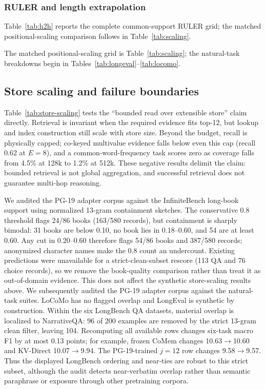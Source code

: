 

\subsubsection{RULER and length extrapolation}
Table~\ref{tab:h2h} reports the complete common-support RULER grid; the
matched positional-scaling comparison follows in Table~\ref{tab:scaling}.

The matched positional-scaling grid is Table~\ref{tab:scaling}; the natural-task breakdowns begin in Tables~\ref{tab:longeval}--\ref{tab:locomo}.






\subsection{Store scaling and failure boundaries}
\label{app:scaling}
Table~\ref{tab:store-scaling} tests the ``bounded read over extensible store''
claim directly. Retrieval is invariant when the required evidence fits top-12,
but lookup and index construction still scale with store size. Beyond the budget,
recall is physically capped; co-keyed multivalue evidence falls below even this
cap (recall 0.62 at $E{=}8$), and a common-word-frequency task scores zero as
coverage falls from 4.5\% at 128k to 1.2\% at 512k. These negative results delimit
the claim: bounded retrieval is not global aggregation, and successful retrieval
does not guarantee multi-hop reasoning.



We audited the PG-19 adapter corpus against the InfiniteBench long-book support
using normalized 13-gram containment sketches. The conservative 0.8 threshold
flags 24/86 books (163/580 records), but containment is sharply bimodal: 31 books
are below 0.10, no book lies in 0.18--0.60, and 54 are at least 0.60. Any cut in
0.20--0.60 therefore flags 54/86 books and 387/580 records; anonymized character
names make the 0.8 count an undercount. Existing predictions were unavailable
for a strict-clean-subset rescore (113 QA and 76 choice records), so we remove
the book-quality comparison rather than treat it as out-of-domain evidence.
This does not affect the synthetic store-scaling results above.
We subsequently audited the PG-19 adapter corpus against the natural-task
suites. LoCoMo has no flagged overlap and LongEval is synthetic by construction.
Within the six LongBench QA datasets, material overlap is localized to
NarrativeQA: 96 of 200 examples are removed by the strict 13-gram clean filter,
leaving 104. Recomputing all available rows changes six-task macro F1 by at most
0.13 points; for example, frozen CoMem changes 10.63$\rightarrow$10.60 and
KV-Direct 10.07$\rightarrow$9.94. The PG-19-trained $j{=}12$ row changes
9.58$\rightarrow$9.57. Thus the displayed LongBench ordering and near-ties are
robust to this strict subset, although the audit detects near-verbatim overlap
rather than semantic paraphrase or exposure through other pretraining corpora.

